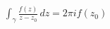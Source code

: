 \documentclass[preview]{standalone}
\begin{document}
\begin{align*}
\int_\gamma \frac{f(z)}{z - z_0} \, dz = 2\pi i f(z_0)
\end{align*}
\end{document}
